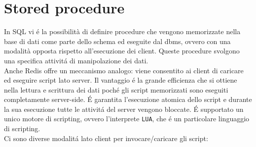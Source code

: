 \section{Stored procedure}
In SQL vi é la possibilità di definire procedure che vengono memorizzate nella base di dati come parte dello schema ed eseguite dal dbms,
ovvero con una modalità opposta rispetto all'esecuzione dei client. Queste procedure svolgono una specifica attivitá di manipolazione dei dati.\\
Anche Redis offre un meccanismo analogo: viene consentito ai client di caricare ed eseguire script lato server.
Il vantaggio é la grande efficienza che si ottiene nella lettura e scrittura dei dati poché gli script
memorizzati sono eseguiti completamente server-side.
É garantita l'esecuzione atomica dello script e durante la sua esecuzione tutte le attivitá del server vengono bloccate.
É supportato un unico motore di scripting, ovvero l'interprete \texttt{LUA}, che é un particolare linguaggio di scripting.
\\
Ci sono diverse modalitá lato client per invocare/caricare gli script:

